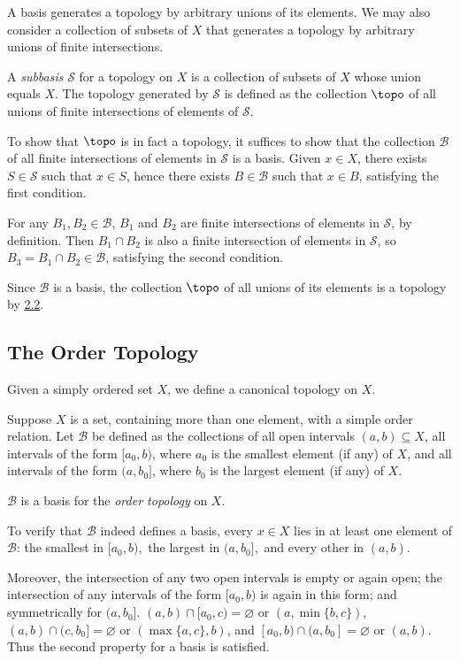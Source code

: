 A basis generates a topology by arbitrary unions of its elements. We may also consider a collection of subsets of $X$ that generates a topology by arbitrary unions of finite intersections.
\begin{definition}\label{2.7}
    A {\it subbasis} $\mathcal{S}$ for a topology on $X$ is a collection of subsets of $X$ whose union equals $X$. The topology generated by $\mathcal{S}$ is defined as the collection $\topo$ of all unions of finite intersections of elements of $\mathcal{S}.$
\end{definition}
To show that $\topo$ is in fact a topology, it suffices to show that the collection $\mathcal{B}$ of all finite intersections of elements in $\mathcal{S}$ is a basis. Given $x \in X$, there exists $S \in \mathcal{S}$ such that $x \in S$, hence there exists $B \in \mathcal{B}$ such that $x \in B$, satisfying the first condition.

For any $B_1, B_2 \in \mathcal{B}$, $B_1$ and $B_2$ are finite intersections of elements in $\mathcal{S}$, by definition. Then $B_1 \cap B_2$ is also a finite intersection of elements in $\mathcal{S}$, so $B_3 = B_1 \cap B_2 \in \mathcal{B}$, satisfying the second condition.

Since $\mathcal{B}$ is a basis, the collection $\topo$ of all unions of its elements is a topology by \hyperref[2.2]{2.2}.

\subsection{The Order Topology}
Given a simply ordered set $X$, we define a canonical topology on $X$.
\begin{definition}\label{2.8}
    Suppose $X$ is a set, containing more than one element, with a simple order relation. Let $\mathcal{B}$ be defined as the collections of all open intervals $(a, b) \subseteq X$, all intervals of the form $[a_0, b)$, where $a_0$ is the smallest element (if any) of $X$, and all intervals of the form $(a, b_0]$, where $b_0$ is the largest element (if any) of $X$.

    $\mathcal{B}$ is a basis for the {\it order topology} on $X$.
\end{definition}
To verify that $\mathcal{B}$ indeed defines a basis, every $x \in X$ lies in at least one element of $\mathcal{B}$: the smallest in $[a_0, b),$ the largest in $(a, b_0],$ and every other in $(a, b)$. 

Moreover, the intersection of any two open intervals is empty or again open; the intersection of any intervals of the form $[a_0, b)$ is again in this form; and symmetrically for $(a, b_0]$. $(a, b) \cap [a_0, c) = \varnothing$ or $(a, \min \{b, c\})$, $(a, b) \cap (c, b_0] = \varnothing$ or $(\max\{a, c\}, b)$, and $[a_0, b) \cap (a, b_0] = \varnothing$ or $(a, b)$. Thus the second property for a basis is satisfied.

